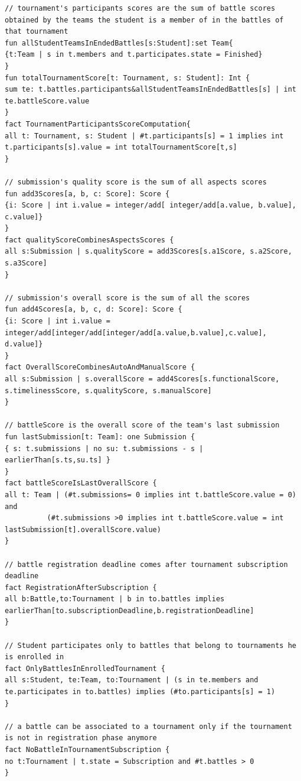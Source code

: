 \begin{lstlisting}[language=alloy]
// tournament's participants scores are the sum of battle scores obtained by the teams the student is a member of in the battles of that tournament
fun allStudentTeamsInEndedBattles[s:Student]:set Team{
{t:Team | s in t.members and t.participates.state = Finished}
}
fun totalTournamentScore[t: Tournament, s: Student]: Int {
sum te: t.battles.participants&allStudentTeamsInEndedBattles[s] | int te.battleScore.value
}
fact TournamentParticipantsScoreComputation{ 
all t: Tournament, s: Student | #t.participants[s] = 1 implies int t.participants[s].value = int totalTournamentScore[t,s]
}

// submission's quality score is the sum of all aspects scores
fun add3Scores[a, b, c: Score]: Score {
{i: Score | int i.value = integer/add[ integer/add[a.value, b.value], c.value]}
}
fact qualityScoreCombinesAspectsScores {
all s:Submission | s.qualityScore = add3Scores[s.a1Score, s.a2Score, s.a3Score] 
}

// submission's overall score is the sum of all the scores
fun add4Scores[a, b, c, d: Score]: Score {
{i: Score | int i.value = integer/add[integer/add[integer/add[a.value,b.value],c.value], d.value]}
}
fact OverallScoreCombinesAutoAndManualScore {
all s:Submission | s.overallScore = add4Scores[s.functionalScore, s.timelinessScore, s.qualityScore, s.manualScore]
}

// battleScore is the overall score of the team's last submission
fun lastSubmission[t: Team]: one Submission {
{ s: t.submissions | no su: t.submissions - s | earlierThan[s.ts,su.ts] }
}
fact battleScoreIsLastOverallScore {
all t: Team | (#t.submissions= 0 implies int t.battleScore.value = 0) and
	      (#t.submissions >0 implies int t.battleScore.value = int lastSubmission[t].overallScore.value)
}

// battle registration deadline comes after tournament subscription deadline
fact RegistrationAfterSubscription {
all b:Battle,to:Tournament | b in to.battles implies earlierThan[to.subscriptionDeadline,b.registrationDeadline]
}

// Student participates only to battles that belong to tournaments he is enrolled in
fact OnlyBattlesInEnrolledTournament {
all s:Student, te:Team, to:Tournament | (s in te.members and te.participates in to.battles) implies (#to.participants[s] = 1)
}

// a battle can be associated to a tournament only if the tournament is not in registration phase anymore
fact NoBattleInTournamentSubscription {
no t:Tournament | t.state = Subscription and #t.battles > 0
}


\end{lstlisting}

